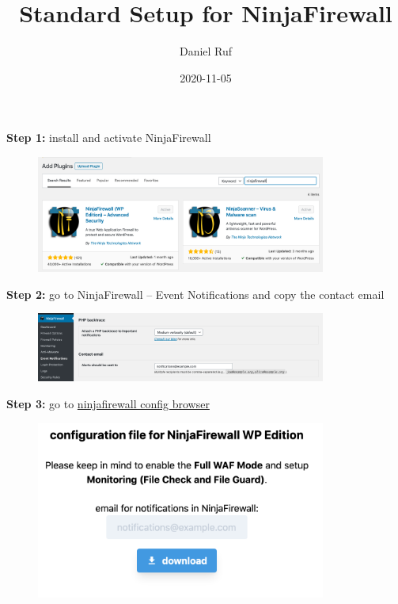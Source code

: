 \documentclass[a4paper]{article}
\title{Standard Setup for NinjaFirewall}\let\Title\@title
\author{Daniel Ruf}\let\Author\@author
\date{2020-11-05} \let\Date\@date
\newcommand{\Version}{1.2}
\begin{document}
\lhead{\Title}
\lfoot{v\Version}
\rfoot{\today}

\noindent


\noindent
\textbf{Step 1:} install and activate NinjaFirewall

\begin{figure}[H]
  \centering
  \includegraphics[width=0.85\textwidth]{images/1.png}
\end{figure}

\noindent
\textbf{Step 2:} go to NinjaFirewall -- Event Notifications and copy the contact email

\begin{figure}[H]
  \centering
  \includegraphics[width=0.85\textwidth]{images/2.png}
\end{figure}

\noindent
\textbf{Step 3:} go to \href{https://danielruf.github.io/ninjafirewall-config-browser/}{ninjafirewall config browser}

\begin{figure}[H]
  \centering
  \includegraphics[width=0.85\textwidth]{images/3.png}
\end{figure}
\end{document}
